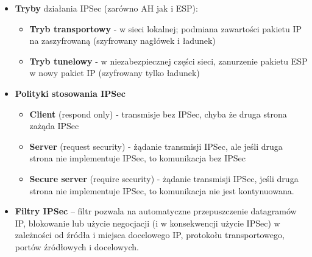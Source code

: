 \documentclass[main.tex]{subfiles}
\begin{document}
\begin{itemize}[noitemsep]
        \item \textbf{Tryby} działania IPSec (zarówno AH jak i ESP):
        \begin{itemize}[noitemsep]
            \item \textbf{Tryb transportowy} - w sieci lokalnej; podmiana zawartości pakietu IP na zaszyfrowaną (szyfrowany
            nagłówek i ładunek)
            \item \textbf{Tryb tunelowy} - w niezabezpiecznej części sieci, zanurzenie pakietu ESP w nowy pakiet IP
            (szyfrowany tylko ładunek)
        \end{itemize}

        \item \textbf{Polityki stosowania IPSec}
        \begin{itemize}[noitemsep]
            \item \textbf{Client} (respond only) - transmisje bez IPSec, chyba że druga strona zażąda IPSec
            \item \textbf{Server} (request security) - żądanie transmisji IPSec, ale jeśli druga strona nie implementuje IPSec, to komunikacja bez IPSec
            \item \textbf{Secure server} (require security) - żądanie transmisji IPSec, jeśli druga strona nie implementuje IPSec, to komunikacja nie jest kontynuowana.
        \end{itemize}

        \item \textbf{Filtry IPSec} -- filtr pozwala na automatyczne przepuszczenie datagramów IP, blokowanie lub użycie
        negocjacji (i w konsekwencji użycie IPSec) w zależności od źródła i miejsca docelowego IP, protokołu
        transportowego, portów źródłowych i docelowych.
    \end{itemize}
\end{document}

